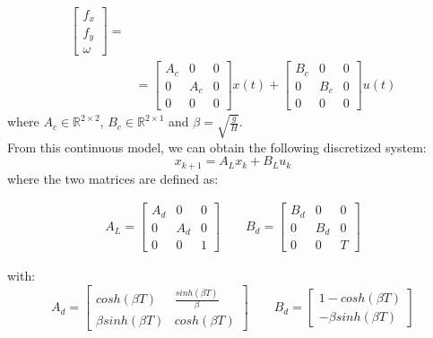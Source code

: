 \begin{align}
\begin{bmatrix}
        f_{x} \\
        f_{y} \\
        \omega
    \end{bmatrix}
    =
    \\
    &= 
    \begin{bmatrix}
        A_c & 0 & 0 \\
        0 & A_c & 0 \\
        0 & 0 & 0
    \end{bmatrix}
    x(t) +
    \begin{bmatrix}
        B_c & 0 & 0 \\
        0 & B_c & 0 \\
        0 & 0 & 0
    \end{bmatrix}
    u(t)
\end{align}
where $A_{c} \in \mathbb{R}^{2 \times 2}$, $B_{c} \in \mathbb{R}^{2 \times 1}$ and $\beta = \sqrt{\frac{g}{H}}$.
\\
From this continuous model, we can obtain the following discretized system: 
\begin{equation}
    x_{k+1} = A_{L}x_{k} + B_{L}u_{k}
\end{equation}
where the two matrices are defined as:

\begin{align}
    A_{L} = 
    \begin{bmatrix}
        A_{d} & 0 & 0 \\
        0 & A_{d} & 0 \\
        0 & 0 & 1
    \end{bmatrix}
    \qquad
    B_{d} = 
    \begin{bmatrix}
        B_{d} & 0 & 0 \\
        0 & B_{d} & 0 \\
        0 & 0 & T
    \end{bmatrix}
\end{align}

with:
\begin{equation}
    A_{d} = 
    \begin{bmatrix}
        cosh(\beta T) & \frac{sinh(\beta T)}{\beta} \\
        \beta sinh(\beta T) & cosh(\beta T)
    \end{bmatrix}
    \qquad
    B_{d} = 
    \begin{bmatrix}
        1 - cosh(\beta T) \\
        - \beta sinh(\beta T)
    \end{bmatrix}
\end{equation}

